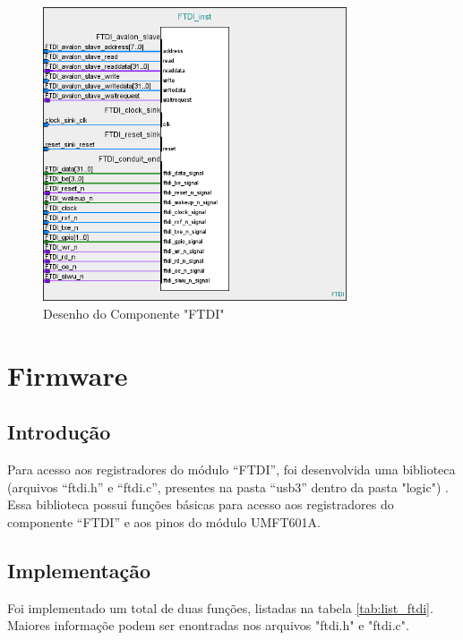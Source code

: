  
  \begin{figure}[htpb]
  	\centering
    \includegraphics[width=0.8\textwidth]{figs/Componente_FTDI}
  	\caption{Desenho do Componente "FTDI"{}}
  	\label{fig:component_ftdi}
  \end{figure}

\chapter{Firmware}

  \section{Introdução}
    Para acesso aos registradores do módulo “FTDI”, foi desenvolvida uma biblioteca (arquivos “ftdi.h” e “ftdi.c”, presentes na pasta “usb3” dentro da pasta "logic") . Essa biblioteca possui funções básicas para acesso aos registradores do componente “FTDI” e aos pinos do módulo UMFT601A.

  \section{Implementação}
    Foi implementado um total de duas funções, listadas na tabela \ref{tab:list_ftdi}. Maiores informaçõe podem ser enontradas nos arquivos "ftdi.h" e "ftdi.c".
    \bigskip

